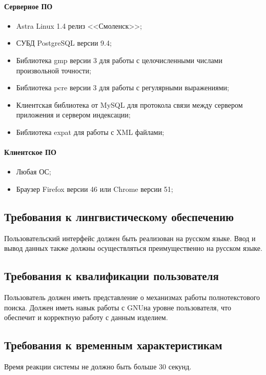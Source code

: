\documentclass[russian,utf8,emptystyle]{eskdtext}
\begin{document}
\paragraph*{Серверное ПО} \hfill

\begin{itemize}
\item Astra Linux 1.4 релиз <<Смоленск>>;
\item СУБД PostgreSQL версии 9.4;
\item Библиотека gmp версии 3 для работы с целочисленными числами произвольной точности;
\item Библиотека pcre версии 3 для работы с регулярными выражениями;
\item Клиентская библиотека от MySQL для протокола связи между сервером приложения и сервером индексации;
\item Библиотека expat для работы с XML файлами;
\end{itemize}

\paragraph*{Клиентское ПО} \hfill

\begin{itemize}
\item Любая ОС;
\item Браузер Firefox версии 46 или Chrome версии 51;
\end{itemize}

\subsection{Требования к лингвистическому обеспечению}

Пользовательский интерфейс должен быть реализован на русском языке. Ввод и вывод данных также должны осуществляться преимущественно на русском языке.

\subsection{Требования к квалификации пользователя}

Пользователь должен иметь представление о механизмах работы полнотекстового поиска. Должен иметь навык работы с GNU\Linux на уровне пользователя, что обеспечит и корректную работу с данным изделием.

\subsection{Требования к временным характеристикам}
Время реакции системы не должно быть больше 30 секунд.
\end{document}
